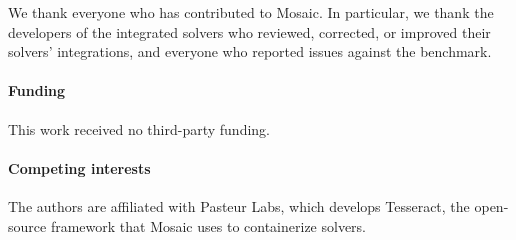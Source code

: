We thank everyone who has contributed to Mosaic. In particular, we thank the
developers of the integrated solvers who reviewed, corrected, or improved their
solvers' integrations, and everyone who reported issues against the benchmark.

\ifpreprint\else
\paragraph{Funding}
This work received no third-party funding.

\paragraph{Competing interests}
The authors are affiliated with Pasteur Labs, which develops Tesseract, the
open-source framework that Mosaic uses to containerize solvers.
\fi
